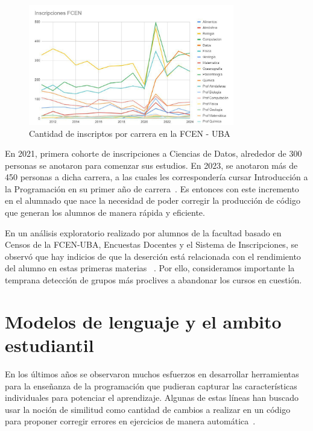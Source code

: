 \documentclass[11pt,a4paper,twoside,openany]{tesis}
\begin{document}
\begin{figure}[H]
    \centering
    \includegraphics[width=0.8\textwidth]{imagenes/inscriptos-por-carrera.jpg}
    \caption{Cantidad de inscriptos por carrera en la FCEN - UBA ~\cite{DOV}}
    \label{grafico-dov}
\end{figure}

En 2021, primera cohorte de inscripciones a Ciencias de Datos, alrededor de 300 personas se anotaron para comenzar sus estudios. En 2023, se anotaron más de 450 personas a dicha carrera, a las cuales les correspondería cursar Introducción a la Programación en su primer año de carrera~\cite{primeros-datos}. Es entonces con este incremento en el alumnado que nace la necesidad de poder corregir la producción de código que generan los alumnos de manera rápida y eficiente. 

En un análisis exploratorio realizado por alumnos de la facultad basado en Censos de la FCEN-UBA, Encuestas Docentes y el Sistema de Inscripciones, se observó que hay indicios de que la deserción está relacionada con el rendimiento del alumno en estas primeras materias ~\cite{analisis-exploratorio}. Por ello, consideramos importante la temprana detección de grupos más proclives a abandonar los cursos en cuestión. 

\section{Modelos de lenguaje y el ambito estudiantil}

En los últimos años se observaron muchos esfuerzos en desarrollar herramientas para la enseñanza de la programación que pudieran capturar las características individuales para potenciar el aprendizaje. Algunas de estas líneas han buscado usar la noción de similitud como cantidad de cambios a realizar en un código para proponer corregir errores en ejercicios de manera automática~\cite{gulwani2018automated}.
\end{document}
